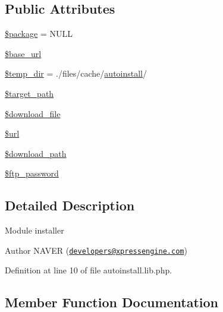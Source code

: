 \subsection*{Public Attributes}
\begin{DoxyCompactItemize}
\item 
\hyperlink{classModuleInstaller_a44c1003f12fa92f8b3eda2ec82159ead}{\$package} = N\+U\+LL
\item 
\hyperlink{classModuleInstaller_a292b18d8c31dfa2cbac3bf90520b7128}{\$base\+\_\+url}
\item 
\hyperlink{classModuleInstaller_a65850d513e6f6fdae18ee0654efb956c}{\$temp\+\_\+dir} = \textquotesingle{}./files/cache/\hyperlink{classautoinstall}{autoinstall}/\textquotesingle{}
\item 
\hyperlink{classModuleInstaller_ac689b9d90b9845e4edb9726e5a0c1fd5}{\$target\+\_\+path}
\item 
\hyperlink{classModuleInstaller_a84752841ec1979052e8a2b700e8c93df}{\$download\+\_\+file}
\item 
\hyperlink{classModuleInstaller_a01a6bf5f232c00fff146a58fb8c14b84}{\$url}
\item 
\hyperlink{classModuleInstaller_aa420e990f8276272c79846ad25a54858}{\$download\+\_\+path}
\item 
\hyperlink{classModuleInstaller_ae6f8a411a4905b14ed0c03db7288b169}{\$ftp\+\_\+password}
\end{DoxyCompactItemize}


\subsection{Detailed Description}
Module installer \begin{DoxyAuthor}{Author}
N\+A\+V\+ER (\href{mailto:developers@xpressengine.com}{\tt developers@xpressengine.\+com}) 
\end{DoxyAuthor}


Definition at line 10 of file autoinstall.\+lib.\+php.



\subsection{Member Function Documentation}
\mbox{\label{classModuleInstaller_aeaa5ff80b85cbf6718f19e755fcbc016}} 
